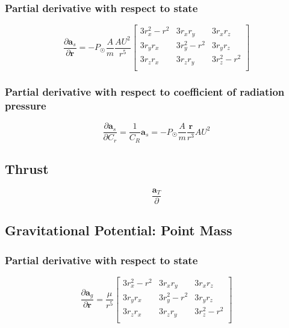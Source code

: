 \subsubsection{Partial derivative with respect to state}

\begin{equation}
    \frac{\partial{\bm{a}_{s}}}{\partial{\mathbf{r}}} =
    -P_\Sun\frac{A}{m}\frac{AU^2}{r^5}
    \begin{bmatrix}
    3r_x^2-r^2 & 3r_xr_y    & 3r_xr_z \\
    3r_yr_x    & 3r_y^2-r^2 & 3r_yr_z \\
    3r_zr_x    & 3r_zr_y    & 3r_z^2-r^2 \\
    \end{bmatrix}
    \label{eq:partial_srp_state}
\end{equation}

\subsubsection{Partial derivative with respect to coefficient of radiation pressure}

\begin{equation}
    \frac{\partial\bm{a}_{s}}{\partial{C_r}}
    =
    \frac{1}{C_R}\bm{a}_s
    =
    -P_\Sun\frac{A}{m}\frac{\mathbf{r}}{r^3}AU^2
    \label{eq:partial_srp_cr}
\end{equation}

\subsection{Thrust}

\begin{equation}
    \frac{\bm{a}_T}{\partial{}}
\end{equation}

\subsection{Gravitational Potential: Point Mass}

\subsubsection{Partial derivative with respect to state}
\begin{equation}
    \frac{\partial{\bm{a}_{g}}}{\partial{\mathbf{r}}}  =
    \frac{\mu}{r^5}
    \begin{bmatrix}
    3r_x^2-r^2 & 3r_xr_y    & 3r_xr_z \\
    3r_yr_x    & 3r_y^2-r^2 & 3r_yr_z \\
    3r_zr_x    & 3r_zr_y    & 3r_z^2-r^2 \\
    \end{bmatrix}
    \label{eq:partial_point_mass_wrt_state}
\end{equation}

